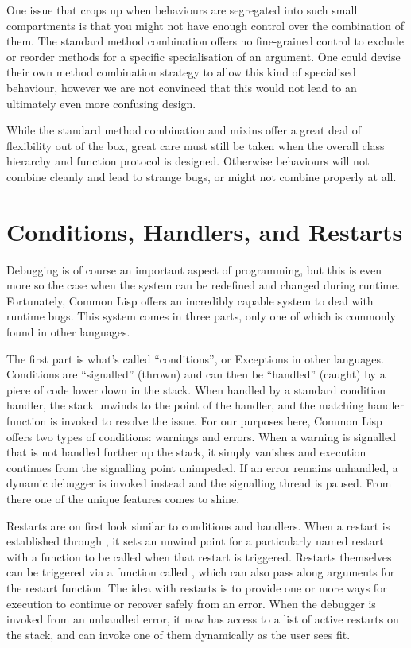 \documentclass[a4paper]{paper}
\begin{document}
One issue that crops up when behaviours are segregated into such small compartments is that you might not have enough control over the combination of them. The standard method combination offers no fine-grained control to exclude or reorder methods for a specific specialisation of an argument. One could devise their own method combination strategy to allow this kind of specialised behaviour, however we are not convinced that this would not lead to an ultimately even more confusing design.

While the standard method combination and mixins offer a great deal of flexibility out of the box, great care must still be taken when the overall class hierarchy and function protocol is designed. Otherwise behaviours will not combine cleanly and lead to strange bugs, or might not combine properly at all.

\section{Conditions, Handlers, and Restarts}
Debugging is of course an important aspect of programming, but this is even more so the case when the system can be redefined and changed during runtime. Fortunately, Common Lisp offers an incredibly capable system to deal with runtime bugs. This system comes in three parts, only one of which is commonly found in other languages.

The first part is what's called ``conditions'', or Exceptions in other languages. Conditions are ``signalled'' (thrown) and can then be ``handled'' (caught) by a piece of code lower down in the stack. When handled by a standard condition handler, the stack unwinds to the point of the handler, and the matching handler function is invoked to resolve the issue. For our purposes here, Common Lisp offers two types of conditions: warnings and errors. When a warning is signalled that is not handled further up the stack, it simply vanishes and execution continues from the signalling point unimpeded. If an error remains unhandled, a dynamic debugger is invoked instead and the signalling thread is paused. From there one of the unique features comes to shine.

Restarts are on first look similar to conditions and handlers. When a restart is established through , it sets an unwind point for a particularly named restart with a function to be called when that restart is triggered. Restarts themselves can be triggered via a function called , which can also pass along arguments for the restart function. The idea with restarts is to provide one or more ways for execution to continue or recover safely from an error. When the debugger is invoked from an unhandled error, it now has access to a list of active restarts on the stack, and can invoke one of them dynamically as the user sees fit.
\end{document}
